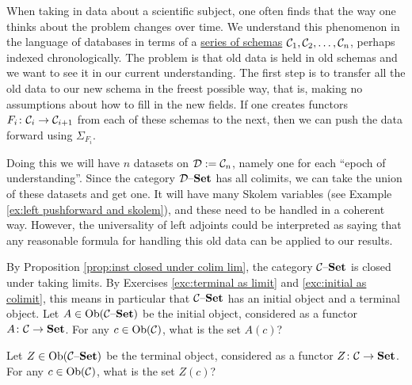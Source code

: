 \documentclass[CT4S-EN-RU]{subfiles}
\begin{document}
\begin{application}

When taking in data about a scientific subject, one often finds that the way one thinks about the problem changes over time. We understand this phenomenon in the language of databases in terms of a \href{http://en.wikipedia.org/wiki/Schema_evolution}{\text series of schemas} $\mathcal{C}_1,\mathcal{C}_2,\ldots,\mathcal{C}_n$, perhaps indexed chronologically. The problem is that old data is held in old schemas and we want to see it in our current understanding. The first step is to transfer all the old data to our new schema in the freest possible way, that is, making no assumptions about how to fill in the new fields. If one creates functors $F_i\colon\mathcal{C}_i\rightarrow\mathcal{C}_{i+1}$ from each of these schemas to the next, then we can push the data forward using $\Sigma_{F_i}$. 

Doing this we will have $n$ datasets on $\mathcal{D}:=\mathcal{C}_n$, namely one for each “epoch of understanding”. Since the category $\mathcal{D}{\text \textendash}{\bf Set}$ has all colimits, we can take the union of these datasets and get one. It will have many Skolem variables (see Example \ref{ex:left pushforward and skolem}), and these need to be handled in a coherent way. However, the universality of left adjoints could be interpreted as saying that any reasonable formula for handling this old data can be applied to our results.

\end{application}

\begin{exercise}\label{exc:universal objects in C-set}
By Proposition \ref{prop:inst closed under colim lim}, the category $\mathcal{C}{\text \textendash}{\bf Set}$ is closed under taking limits. By Exercises \ref{exc:terminal as limit} and \ref{exc:initial as colimit}, this means in particular that $\mathcal{C}{\text \textendash}{\bf Set}$ has an initial object and a terminal object. 
\sexc Let $A\in\textnormal{Ob}(\mathcal{C}{\text \textendash}{\bf Set})$ be the initial object, considered as a functor $A\colon\mathcal{C}\rightarrow{\bf Set}$. For any $c\in\textnormal{Ob}(\mathcal{C})$, what is the set $A(c)$?
\item Let $Z\in\textnormal{Ob}(\mathcal{C}{\text \textendash}{\bf Set})$ be the terminal object, considered as a functor $Z\colon\mathcal{C}\rightarrow{\bf Set}$. For any $c\in\textnormal{Ob}(\mathcal{C})$, what is the set $Z(c)$?
\endsexc
\end{exercise}
\end{document}
